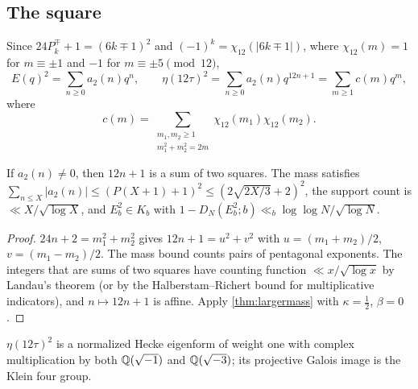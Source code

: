 \documentclass[11pt]{article}
\newcommand{\LL}{\log\log N}
\begin{document}
\subsection{The square}\label{subsec:square}

Since $24P_k^\mp+1=(6k\mp1)^2$ and $(-1)^k=\chi_{12}(|6k\mp1|)$, where $\chi_{12}(m)=1$ for
$m\equiv\pm1$ and $-1$ for $m\equiv\pm5\pmod{12}$,
\[
E(q)^2=\sum_{n\ge0}a_2(n)q^n,\qquad \eta(12\tau)^2=\sum_{n\ge0}a_2(n)q^{12n+1}=\sum_{m\ge1}c(m)q^m,
\]
where
\[
c(m)=\sum_{\substack{m_1,m_2\ge1\\ m_1^2+m_2^2=2m}}\chi_{12}(m_1)\chi_{12}(m_2).
\]

\begin{proposition}\label{prop:squareelem}
If $a_2(n)\ne0$, then $12n+1$ is a sum of two squares. The mass satisfies
$\sum_{n\le X}|a_2(n)|\le(P(X+1)+1)^2\le(2\sqrt{2X/3}+2)^2$, the support count is
$\ll X/\sqrt{\log X}$, and $E_b^2\in K_b$ with $1-D_N(E_b^2;b)\ll_b\LL/\sqrt{\log N}$.
\end{proposition}

\begin{proof}
$24n+2=m_1^2+m_2^2$ gives $12n+1=u^2+v^2$ with $u=(m_1+m_2)/2$, $v=(m_1-m_2)/2$. The mass bound
counts pairs of pentagonal exponents. The integers that are sums of two squares have
counting function $\ll x/\sqrt{\log x}$ by Landau's theorem (or by the Halberstam--Richert
bound for multiplicative indicators), and $n\mapsto12n+1$ is affine. Apply
\cref{thm:largermass} with $\kappa=\frac12$, $\beta=0$.
\end{proof}

\begin{theorem}\label{thm:etainput}
$\eta(12\tau)^2$ is a normalized Hecke eigenform of weight one with complex multiplication
by both $\mathbb Q(\sqrt{-1})$ and $\mathbb Q(\sqrt{-3})$; its projective Galois image is the Klein four
group.
\end{theorem}
\end{document}
